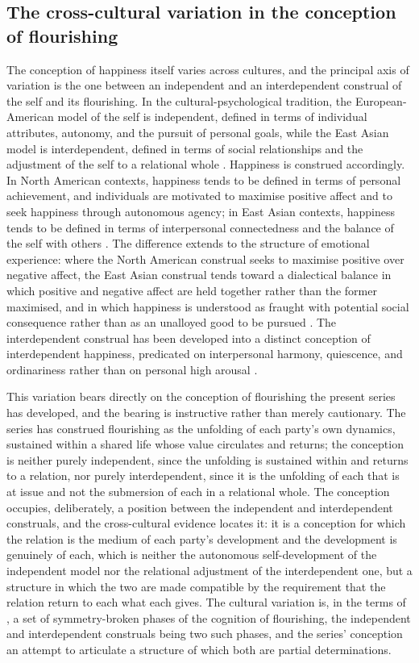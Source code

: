 \subsection{The cross-cultural variation in the conception of flourishing}
\label{p11:sec:cc-happiness}

The conception of happiness itself varies across cultures, and the principal axis of variation is the one between an independent and an interdependent construal of the self and its flourishing. In the cultural-psychological tradition, the European-American model of the self is independent, defined in terms of individual attributes, autonomy, and the pursuit of personal goals, while the East Asian model is interdependent, defined in terms of social relationships and the adjustment of the self to a relational whole \parencite{markus1991}. Happiness is construed accordingly. In North American contexts, happiness tends to be defined in terms of personal achievement, and individuals are motivated to maximise positive affect and to seek happiness through autonomous agency; in East Asian contexts, happiness tends to be defined in terms of interpersonal connectedness and the balance of the self with others \parencite{uchida2004}. The difference extends to the structure of emotional experience: where the North American construal seeks to maximise positive over negative affect, the East Asian construal tends toward a dialectical balance in which positive and negative affect are held together rather than the former maximised, and in which happiness is understood as fraught with potential social consequence rather than as an unalloyed good to be pursued \parencite{uchida2009}. The interdependent construal has been developed into a distinct conception of interdependent happiness, predicated on interpersonal harmony, quiescence, and ordinariness rather than on personal high arousal \parencite{hitokoto2015}.

This variation bears directly on the conception of flourishing the present series has developed, and the bearing is instructive rather than merely cautionary. The series has construed flourishing as the unfolding of each party's own dynamics, sustained within a shared life whose value circulates and returns; the conception is neither purely independent, since the unfolding is sustained within and returns to a relation, nor purely interdependent, since it is the unfolding of each that is at issue and not the submersion of each in a relational whole. The conception occupies, deliberately, a position between the independent and interdependent construals, and the cross-cultural evidence locates it: it is a conception for which the relation is the medium of each party's development and the development is genuinely of each, which is neither the autonomous self-development of the independent model nor the relational adjustment of the interdependent one, but a structure in which the two are made compatible by the requirement that the relation return to each what each gives. The cultural variation is, in the terms of , a set of symmetry-broken phases of the cognition of flourishing, the independent and interdependent construals being two such phases, and the series' conception an attempt to articulate a structure of which both are partial determinations.

